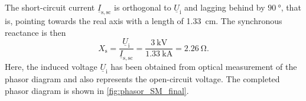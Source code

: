 \begin{solutionblock}
	The short-circuit current $\underline{I}_\mathrm{s,sc}$ is orthogonal to $\underline{U}_\mathrm{i}$ and lagging behind by $\SI{90}{\degree}$, that is, pointing towards the real axis with a length of \SI{1.33}{\cm}. The synchronous reactance is then
	$$X_\mathrm{s} = \frac{\underline{U}_\mathrm{i}}{\underline{I}_\mathrm{s,sc}} = \frac{\SI{3}{\kilo\volt}}{\SI{1.33}{\kilo\ampere}} = \SI{2.26}{\ohm}.$$
	Here, the induced voltage $\underline{U}_\mathrm{i}$ has been obtained from optical measurement of the phasor diagram and also represents the open-circuit voltage. The completed phasor diagram is shown in \autoref{fig:phasor_SM_final}.
\end{solutionblock}


